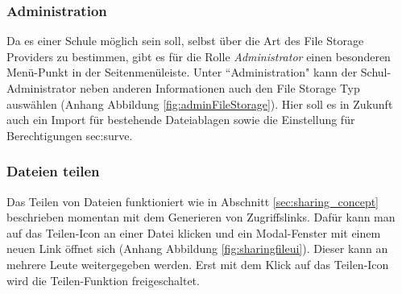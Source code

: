 \subsubsection{Administration}

Da es einer Schule möglich sein soll, selbst über die Art des File Storage Providers zu bestimmen, gibt es für die Rolle \textit{Administrator} einen besonderen Menü-Punkt in der Seitenmenüleiste. Unter ``Administration" kann der Schul-Administrator neben anderen Informationen auch den File Storage Typ auswählen (Anhang Abbildung \ref{fig:adminFileStorage}). Hier soll es in Zukunft auch ein Import für bestehende Dateiablagen sowie die Einstellung für Berechtigungen sec:surve.

\subsubsection{Dateien teilen}

Das Teilen von Dateien funktioniert wie in Abschnitt \ref{sec:sharing_concept} beschrieben momentan mit dem Generieren von Zugriffslinks. Dafür kann man auf das Teilen-Icon an einer Datei klicken und ein Modal-Fenster mit einem neuen Link öffnet sich (Anhang Abbildung \ref{fig:sharingfileui}). Dieser kann an mehrere Leute weitergegeben werden. Erst mit dem Klick auf das Teilen-Icon wird die Teilen-Funktion freigeschaltet. 

\clearpage
